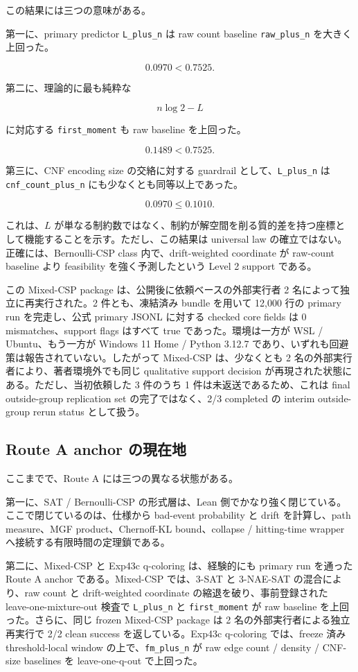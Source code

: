 \documentclass[12pt,a4paper]{article}
\begin{document}
この結果には三つの意味がある。

第一に、primary predictor \texttt{L\_plus\_n} は raw count baseline \texttt{raw\_plus\_n} を大きく上回った。

\[
0.0970 < 0.7525.
\]

第二に、理論的に最も純粋な

\[
n\log 2-L
\]

に対応する \texttt{first\_moment} も raw baseline を上回った。

\[
0.1489 < 0.7525.
\]

第三に、CNF encoding size の交絡に対する guardrail として、\texttt{L\_plus\_n} は \texttt{cnf\_count\_plus\_n} にも少なくとも同等以上であった。

\[
0.0970 \le 0.1010.
\]

これは、\(L\) が単なる制約数ではなく、制約が解空間を削る質的差を持つ座標として機能することを示す。ただし、この結果は universal law の確立ではない。正確には、Bernoulli-CSP class 内で、drift-weighted coordinate が raw-count baseline より feasibility を強く予測したという Level 2 support である。

この Mixed-CSP package は、公開後に依頼ベースの外部実行者 2 名によって独立に再実行された。2 件とも、凍結済み bundle を用いて 12,000 行の primary run を完走し、公式 primary JSONL に対する checked core fields は 0 mismatches、support flags はすべて true であった。環境は一方が WSL / Ubuntu、もう一方が Windows 11 Home / Python 3.12.7 であり、いずれも回避策は報告されていない。したがって Mixed-CSP は、少なくとも 2 名の外部実行者により、著者環境外でも同じ qualitative support decision が再現された状態にある。ただし、当初依頼した 3 件のうち 1 件は未返送であるため、これは final outside-group replication set の完了ではなく、2/3 completed の interim outside-group rerun status として扱う。

\subsection{Route A anchor の現在地}\label{route-a-anchor-ux306eux73feux5728ux5730}

ここまでで、Route A には三つの異なる状態がある。

第一に、SAT / Bernoulli-CSP の形式層は、Lean 側でかなり強く閉じている。ここで閉じているのは、仕様から bad-event probability と drift を計算し、path measure、MGF product、Chernoff-KL bound、collapse / hitting-time wrapper へ接続する有限時間の定理鎖である。

第二に、Mixed-CSP と Exp43c q-coloring は、経験的にも primary run を通った Route A anchor である。Mixed-CSP では、3-SAT と 3-NAE-SAT の混合により、raw count と drift-weighted coordinate の縮退を破り、事前登録された leave-one-mixture-out 検査で \texttt{L\_plus\_n} と \texttt{first\_moment} が raw baseline を上回った。さらに、同じ frozen Mixed-CSP package は 2 名の外部実行者による独立再実行で 2/2 clean success を返している。Exp43c q-coloring では、freeze 済み threshold-local window の上で、\texttt{fm\_plus\_n} が raw edge count / density / CNF-size baselines を leave-one-q-out で上回った。
\end{document}
